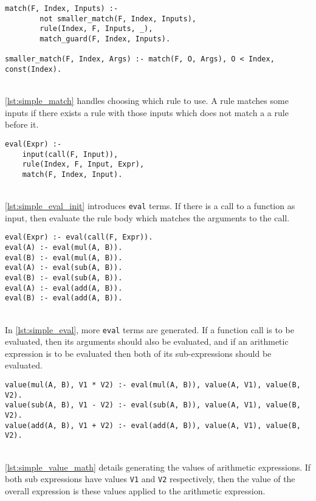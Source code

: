 \begin{lstlisting}[caption={Match rules}, label={lst:simple_match}, firstnumber=197]
match(F, Index, Inputs) :- 
		not smaller_match(F, Index, Inputs), 
		rule(Index, F, Inputs, _), 
		match_guard(F, Index, Inputs).
	
smaller_match(F, Index, Args) :- match(F, O, Args), O < Index, const(Index).
\end{lstlisting}
\mbox{} \\
\ref{lst:simple_match} handles choosing which rule to use. A rule matches some inputs if there exists a rule with those inputs which does not match a a rule before it. \\

\begin{lstlisting}[caption={Eval introduction}, label={lst:simple_eval_init}, firstnumber=128]
eval(Expr) :- 
	input(call(F, Input)), 
	rule(Index, F, Input, Expr), 
	match(F, Index, Input).	
\end{lstlisting}
\mbox{}\\
\ref{lst:simple_eval_init} introduces \lstinline!eval! terms. If there is a call to a function as input, then evaluate the rule body which matches the arguments to the call. \\

\begin{lstlisting}[caption={Eval propagation}, label={lst:simple_eval}, firstnumber=139]
eval(Expr) :- eval(call(F, Expr)).
eval(A) :- eval(mul(A, B)).
eval(B) :- eval(mul(A, B)).
eval(A) :- eval(sub(A, B)).
eval(B) :- eval(sub(A, B)).
eval(A) :- eval(add(A, B)).
eval(B) :- eval(add(A, B)).
\end{lstlisting}
\mbox{}\\
In \ref{lst:simple_eval}, more \lstinline!eval! terms are generated. If a function call is to be evaluated, then its arguments should also be evaluated, and if an arithmetic expression is to be evaluated then both of its sub-expressions should be evaluated. \\ 

\begin{lstlisting}[caption={Value generation for arithmetic}, label={lst:simple_value_math}, firstnumber=61]
value(mul(A, B), V1 * V2) :- eval(mul(A, B)), value(A, V1), value(B, V2).
value(sub(A, B), V1 - V2) :- eval(sub(A, B)), value(A, V1), value(B, V2).
value(add(A, B), V1 + V2) :- eval(add(A, B)), value(A, V1), value(B, V2).
\end{lstlisting}
\mbox{}\\
\ref{lst:simple_value_math} details generating the values of arithmetic expressions. If both sub expressions have values \lstinline!V1! and \lstinline!V2! respectively, then the value of the overall expression is these values applied to the arithmetic expression. \\

